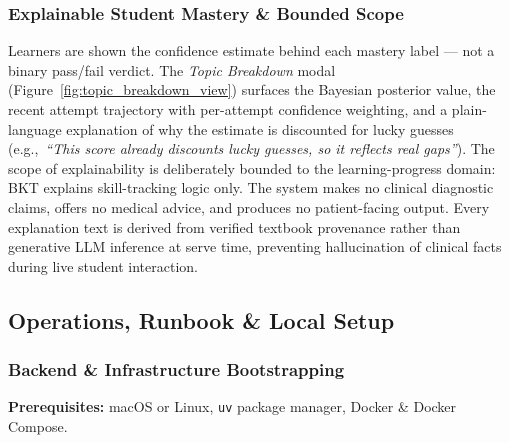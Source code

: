 \subsubsection*{Explainable Student Mastery \& Bounded Scope}

Learners are shown the confidence estimate behind each mastery label --- not a
binary pass/fail verdict. The \textit{Topic Breakdown} modal (Figure~\ref{fig:topic_breakdown_view})
surfaces the Bayesian posterior value, the recent attempt trajectory with per-attempt
confidence weighting, and a plain-language explanation of why the estimate is
discounted for lucky guesses (e.g.,\ \textit{``This score already discounts lucky
guesses, so it reflects real gaps''}). The scope of explainability is deliberately
bounded to the learning-progress domain: BKT explains skill-tracking logic only.
The system makes no clinical diagnostic claims, offers no medical advice, and produces
no patient-facing output. Every explanation text is derived from verified textbook
provenance rather than generative LLM inference at serve time, preventing hallucination
of clinical facts during live student interaction.

\subsection*{Operations, Runbook \& Local Setup}

\subsubsection*{Backend \& Infrastructure Bootstrapping}

\textbf{Prerequisites:} macOS or Linux, \texttt{uv} package manager, Docker \& Docker Compose.

